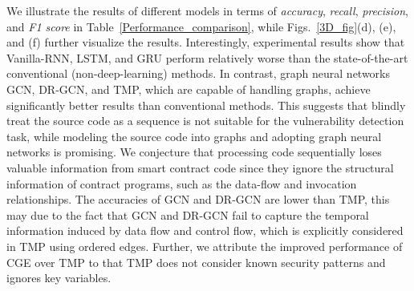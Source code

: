 We illustrate the results of different models in terms of \emph{accuracy}, \emph{recall}, \emph{precision}, and \textit{F1 score} in Table~\ref{Performance_comparison}, while Figs.~\ref{3D_fig}(d), (e), and (f) further visualize the results. Interestingly, experimental results show that Vanilla-RNN, LSTM, and GRU perform relatively worse than the state-of-the-art conventional (non-deep-learning) methods. In contrast, graph neural networks GCN, DR-GCN, and TMP, which are capable of handling graphs, achieve significantly better results than conventional methods. This suggests that blindly treat the source code as a sequence is not suitable for the vulnerability detection task, while modeling the source code into graphs and adopting graph neural networks is promising. We conjecture that processing code sequentially loses valuable information from smart contract code since they ignore the structural information of contract programs, such as the data-flow and invocation relationships. The accuracies of GCN and DR-GCN are lower than TMP,  this may due to the fact that GCN and DR-GCN fail to capture the temporal information induced by data flow and control flow, which is explicitly considered in TMP using ordered edges. Further, we attribute the improved performance of CGE over TMP to that TMP does not consider known security patterns and ignores key variables.

\renewcommand\arraystretch{1.0}
\begin{table*}
\centering
{}
\caption{Accuracy comparison between CGE and its variants on the three vulnerability detection tasks.}
\label{normalization_com}
\end{table*}

